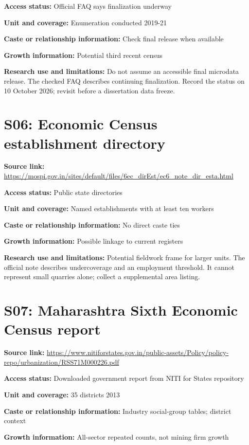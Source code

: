 \documentclass[11pt,a4paper]{report}
\begin{document}
\textbf{Access status:} Official FAQ says finalization underway

\textbf{Unit and coverage:} Enumeration conducted 2019-21

\textbf{Caste or relationship information:} Check final release when available

\textbf{Growth information:} Potential third recent census

\textbf{Research use and limitations:} Do not assume an accessible final microdata release. The checked FAQ describes continuing finalization. Record the status on 10 October 2026; revisit before a dissertation data freeze.

\section{S06: Economic Census establishment directory}\hypertarget{S06}{}
\textbf{Source link:} \url{https://mospi.gov.in/sites/default/files/6ec_dirEst/ec6_note_dir_esta.html}

\textbf{Access status:} Public state directories

\textbf{Unit and coverage:} Named establishments with at least ten workers

\textbf{Caste or relationship information:} No direct caste ties

\textbf{Growth information:} Possible linkage to current registers

\textbf{Research use and limitations:} Potential fieldwork frame for larger units. The official note describes undercoverage and an employment threshold. It cannot represent small quarries alone; collect a supplemental area listing.

\section{S07: Maharashtra Sixth Economic Census report}\hypertarget{S07}{}
\textbf{Source link:} \url{https://www.nitiforstates.gov.in/public-assets/Policy/policy-repo/urbanization/RSS71M000226.pdf}

\textbf{Access status:} Downloaded government report from NITI for States repository

\textbf{Unit and coverage:} 35 districts 2013

\textbf{Caste or relationship information:} Industry social-group tables; district context

\textbf{Growth information:} All-sector repeated counts, not mining firm growth
\end{document}
